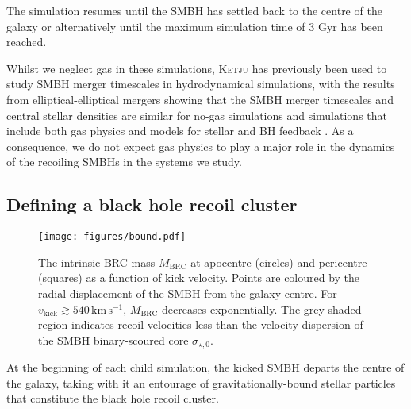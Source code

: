 \documentclass[twocolumn]{aastex631}
\newcommand{\ketju}{\textsc{Ketju}}                           %
\newcommand{\Msun}{\ensuremath{\mathrm{M}_{\sun}}}            %
\newcommand{\kmps}{\ensuremath{\mathrm{km}\,\mathrm{s}^{-1}} }%
\newcommand{\vk}{\ensuremath{v_\mathrm{kick}}}                %
\newcommand{\sigcore}{\ensuremath{\sigma_{\star,0}}}          %
\newcommand{\mbound}{\ensuremath{M_\mathrm{BRC}}}           %
\begin{document}
The simulation resumes until the SMBH has settled back to the centre of the galaxy or alternatively until the maximum simulation time of 3 Gyr has been reached. 

Whilst we neglect gas in these simulations, \ketju{} has previously been used to study SMBH merger timescales in hydrodynamical simulations, with the results from elliptical-elliptical mergers showing that the SMBH merger timescales and central stellar densities are similar for no-gas simulations and simulations that include both gas physics and models for stellar and BH feedback \citep{liao2024a,liao2024b}. 
As a consequence, we do not expect gas physics to play a major role in the dynamics of the recoiling SMBHs in the systems we study.

\subsection{Defining a black hole recoil cluster}
\begin{figure}[t]
    \centering
    \texttt{[image: figures/bound.pdf]}
    \caption{
        The intrinsic BRC mass $\mbound$ at apocentre (circles) and pericentre (squares) as a function of kick velocity.
        Points are coloured by the radial displacement of the SMBH from the galaxy centre.
        For $\vk \gtrsim 540\,\kmps$, $\mbound$ decreases exponentially.
        The grey-shaded region indicates recoil velocities less than the velocity dispersion of the SMBH binary-scoured core $\sigcore$.
    }
    \label{fig:bound}
\end{figure}
At the beginning of each child simulation, the kicked SMBH departs the centre of the galaxy, taking with it an entourage of gravitationally-bound stellar particles that constitute the black hole recoil cluster.

\end{document}
